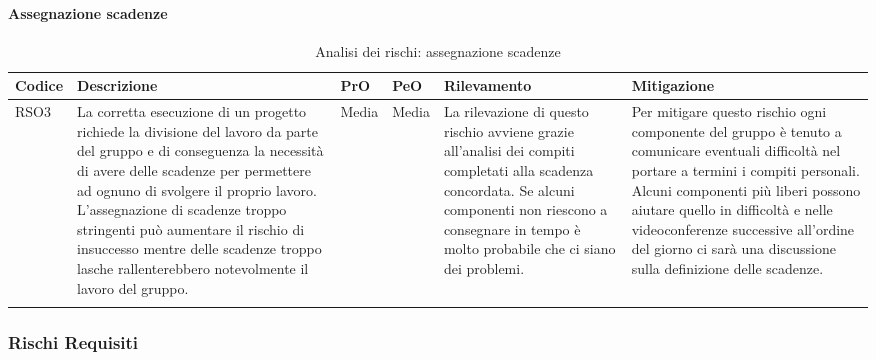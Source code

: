 \paragraph{Assegnazione scadenze}
		\begin{center}

	\begin{longtable}{p{1cm}|p{4cm}|p{0.7cm}|p{0.7cm}|p{3cm}|p{4cm}}
		\arrayrulecolor{white}
		\hline
		\rowcolor{blue!20}
		\textbf{Codice} & 
		\textbf{Descrizione} &
		\textbf{PrO}  &
		\textbf{PeO}  &				        
		\textbf{Rilevamento} &
		\textbf{Mitigazione} \\
		\hline	
		RSO3 & La corretta esecuzione di un progetto richiede la divisione del lavoro da parte del gruppo e di conseguenza la necessità di avere delle scadenze per permettere ad ognuno di svolgere il proprio lavoro. L'assegnazione di scadenze troppo stringenti può aumentare il rischio di insuccesso mentre delle scadenze troppo lasche rallenterebbero notevolmente il lavoro del gruppo. & Media & Media & La rilevazione di questo rischio avviene grazie all'analisi dei compiti completati alla scadenza concordata. Se alcuni componenti non riescono a consegnare in tempo è molto probabile che ci siano dei problemi. & Per mitigare questo rischio ogni componente del gruppo è tenuto a comunicare eventuali difficoltà nel portare a termini i compiti personali. Alcuni componenti più liberi possono aiutare quello in difficoltà e nelle videoconferenze successive all'ordine del giorno ci sarà una discussione sulla definizione delle scadenze. \\
		
		\caption{Analisi dei rischi: assegnazione scadenze}
	\end{longtable}
\end{center}
\subsubsection{Rischi Requisiti}
